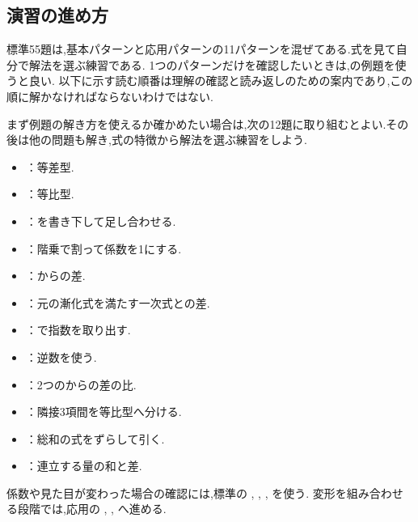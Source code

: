 \subsection*{演習の進め方}\label{節：演習の進め方}
標準55題は,基本パターンと応用パターンの11パターンを混ぜてある.式を見て自分で解法を選ぶ練習である.
1つのパターンだけを確認したいときは,の例題を使うと良い.
以下に示す読む順番は理解の確認と読み返しのための案内であり,この順に解かなければならないわけではない.
\par\smallskip
まず例題の解き方を使えるか確かめたい場合は,次の12題に取り組むとよい.その後は他の問題も解き,式の特徴から解法を選ぶ練習をしよう.

\begin{itemize}
  \item {}：等差型.
  \item {}：等比型.
  \item {}：を書き下して足し合わせる.
  \item {}：階乗で割って係数を1にする.
\end{itemize}
\begin{itemize}
  \item {}：からの差.
  \item {}：元の漸化式を満たす一次式との差.
  \item {}：で指数を取り出す.
  \item {}：逆数を使う.
  \item {}：2つのからの差の比.
\end{itemize}
\begin{itemize}
  \item {}：隣接3項間を等比型へ分ける.
  \item {}：総和の式をずらして引く.
  \item {}：連立する量の和と差.
\end{itemize}
係数や見た目が変わった場合の確認には,標準の
,
,
,
を使う.
変形を組み合わせる段階では,応用の
,
,
へ進める.

